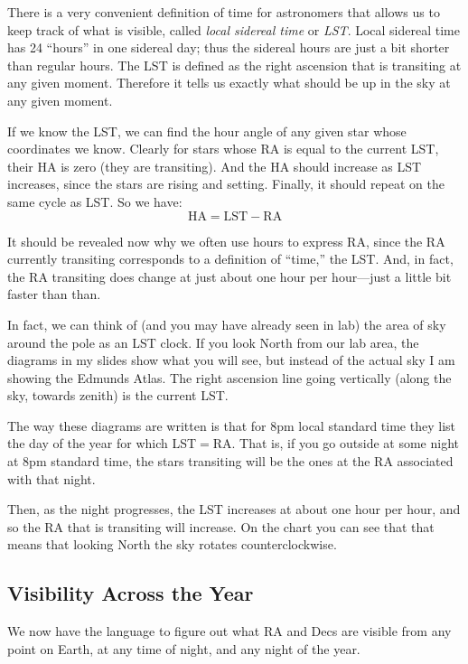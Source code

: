 \documentclass[12pt, preprint]{aastex}
\begin{document}
There is a very convenient definition of time for astronomers that
allows us to keep track of what is visible, called {\it local sidereal
  time} or {\it LST}. Local sidereal time has 24 ``hours'' in one
sidereal day; thus the sidereal hours are just a bit shorter than
regular hours. The LST is defined as the right ascension that is
transiting at any given moment. Therefore it tells us exactly what
should be up in the sky at any given moment.

If we know the LST, we can find the hour angle of any given star whose
coordinates we know. Clearly for stars whose RA is equal to the
current LST, their HA is zero (they are transiting). And the HA should
increase as LST increases, since the stars are rising and
setting. Finally, it should repeat on the same cycle as LST. So we
have:
\begin{equation}
\label{eq:ha}
\mathrm{HA} = \mathrm{LST} - \mathrm{RA}
\end{equation}

It should be revealed now why we often use hours to express RA, since
the RA currently transiting corresponds to a definition of ``time,''
the LST. And, in fact, the RA transiting does change at just about one
hour per hour---just a little bit faster than than.

In fact, we can think of (and you may have already seen in lab) the
area of sky around the pole as an LST clock. If you look North from
our lab area, the diagrams in my slides show what you will see, but
instead of the actual sky I am showing the Edmunds Atlas. The right
ascension line going vertically (along the sky, towards zenith) is the
current LST.

The way these diagrams are written is that for 8pm local standard time
they list the day of the year for which LST$=$RA. That is, if you go
outside at some night at 8pm standard time, the stars transiting will
be the ones at the RA associated with that night.

Then, as the night progresses, the LST increases at about one hour per
hour, and so the RA that is transiting will increase. On the chart you
can see that that means that looking North the sky rotates
counterclockwise.

\subsection{Visibility Across the Year}

We now have the language to figure out what RA and Decs are visible
from any point on Earth, at any time of night, and any night of the
year.
\end{document}
